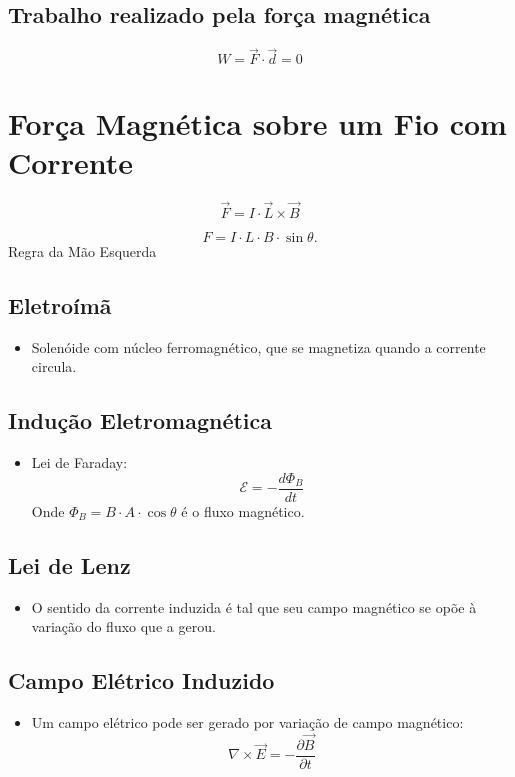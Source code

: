 \documentclass[a4paper,12pt]{article}
\begin{document}
\begin{multicols}{2}
\subsection{Trabalho realizado pela força magnética}
\begin{equation}
    W = \vec{F} \cdot \vec{d} = 0
\end{equation}

\section{Força Magnética sobre um Fio com Corrente}

\begin{equation}
    \vec{F} = I \cdot \vec{L} \times \vec{B}
\end{equation}

\begin{equation}
    F = I \cdot L \cdot B \cdot \sin\theta.
\end{equation}
Regra da M\~ao Esquerda

\subsection{Eletroímã}
\begin{itemize}
    \item Solenóide com núcleo ferromagnético, que se magnetiza quando a corrente circula.
\end{itemize}

\subsection{Indução Eletromagnética}
\begin{itemize}
    \item Lei de Faraday:
    \[
        \mathcal{E} = -\frac{d\Phi_B}{dt}
    \]
    Onde $\Phi_B = B \cdot A \cdot \cos\theta$ é o fluxo magnético.
\end{itemize}

\subsection{Lei de Lenz}
\begin{itemize}
    \item O sentido da corrente induzida é tal que seu campo magnético se opõe à variação do fluxo que a gerou.
\end{itemize}

\subsection{Campo Elétrico Induzido}
\begin{itemize}
    \item Um campo elétrico pode ser gerado por variação de campo magnético:
    \[
        \nabla \times \vec{E} = -\frac{\partial \vec{B}}{\partial t}
    \]
\end{itemize}


\end{multicols}
\end{document}
